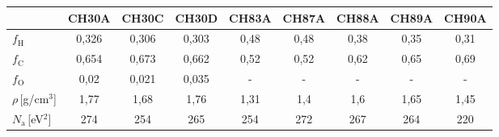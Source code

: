 \begin{tabular}{lcccccccc}
\hline
 & CH30A & CH30C & CH30D & CH83A & CH87A & CH88A & CH89A & CH90A\\
\hline

$f_\mathrm{H}$ & 0,326 & 0,306 & 0,303 & 0,48 & 0,48 & 0,38 & 0,35 & 0,31\\
$f_\mathrm{C}$ & 0,654 & 0,673 & 0,662 & 0,52 & 0,52 & 0,62 & 0,65 & 0,69\\
$f_\mathrm{O}$ & 0,02  & 0,021 & 0,035 & -    & -    &  -   & -    & -   \\ 

$\rho$\,[g/cm$^3$] & 1,77 & 1,68 & 1,76 & 1,31 & 1,4 & 1,6 & 1,65 & 1,45\\
$N_\mathrm{a}$\,[eV$^2$] & 274 & 254 & 265 & 254 & 272 & 267 & 264 & 220 \\
\hline

\end{tabular}
